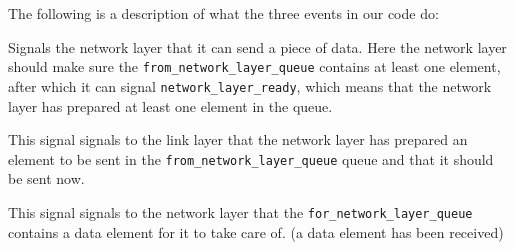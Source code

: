 The following is a description of what the three events in our code do:
\\

%
%

\begin{description}[leftmargin=1em, style=nextline]
\item [\texttt{network\_layer\_allowed\_to\_send}] Signals the network layer that it can send a piece of data.
Here the network layer should make sure the \texttt{from\_network\_layer\_queue}
contains at least one element, after which it can signal \texttt{network\_layer\_ready},
which means that the network layer has prepared at least one element in the queue.

\item [\texttt{network\_layer\_ready}] This signal signals to the link layer that the network layer has prepared an element to be sent in the
  \texttt{from\_network\_layer\_queue} queue and that it should be sent now.

\item [\texttt{data\_for\_network\_layer}]
This signal signals to the network layer that the
\texttt{for\_network\_layer\_queue} contains a data element for it to take care of. (a data element has been received)
\end{description}

\hfill \break
